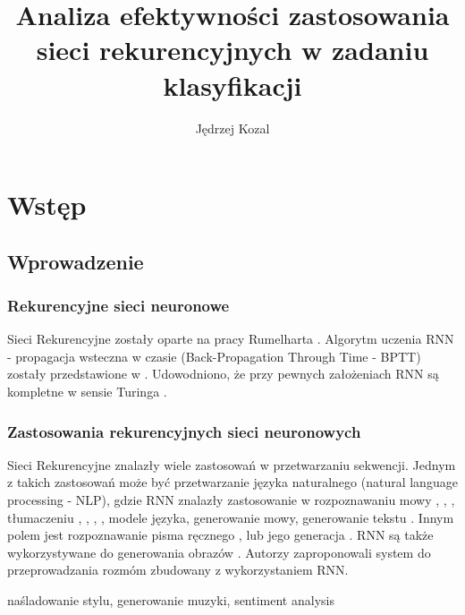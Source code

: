 \documentclass[oneside, mag]{mgr}
\title{Analiza efektywności zastosowania sieci rekurencyjnych w zadaniu klasyfikacji}
\author{Jędrzej Kozal}
\begin{document}
	

\maketitle

\chapter{Wstęp}

\section{Wprowadzenie}

\subsection{Rekurencyjne sieci neuronowe}

Sieci Rekurencyjne zostały oparte na pracy Rumelharta \cite{RNN}. Algorytm uczenia RNN - propagacja wsteczna w czasie (Back-Propagation Through Time - BPTT) zostały przedstawione w \cite{BPTT}.
Udowodniono, że przy pewnych założeniach RNN są kompletne w sensie Turinga \cite{turing-complete}.

\subsection{Zastosowania rekurencyjnych sieci neuronowych}

Sieci Rekurencyjne znalazły wiele zastosowań w przetwarzaniu sekwencji. 
Jednym z takich zastosowań może być przetwarzanie języka naturalnego (natural language processing - NLP), gdzie RNN znalazły zastosowanie w rozpoznawaniu mowy \cite{DBLP:journals/corr/abs-1303-5778}, \cite{speech_recognition}, \cite{speech_recognition1}, tłumaczeniu \cite{translate}, \cite{DBLP:journals/corr/ChoMGBSB14}, \cite{DBLP:journals/corr/BahdanauCB14}, \cite{DBLP:journals/corr/WuSCLNMKCGMKSJL16}, modele języka, generowanie mowy, generowanie tekstu \cite{DBLP:journals/corr/Graves13}. 
Innym polem jest rozpoznawanie pisma ręcznego \cite{handwriting_recognition}, \cite{handwriting_recognition2} lub jego generacja \cite{DBLP:journals/corr/Graves13}.
RNN są także wykorzystywane do generowania obrazów \cite{DBLP:journals/corr/GregorDGW15}. Autorzy \cite{DBLP:journals/corr/VinyalsL15} zaproponowali system do przeprowadzania rozmóm zbudowany z wykorzystaniem RNN.

naśladowanie stylu, generowanie muzyki, sentiment analysis 
\end{document}
